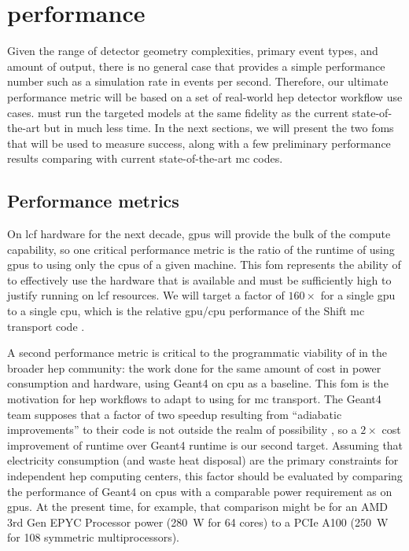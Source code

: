 \section{\celeritas performance}

Given the range of detector geometry complexities, primary event types, and
amount of output, there is no general case that provides a simple performance
number such as a simulation rate in events per second. Therefore, our ultimate
performance metric will be based on a set of real-world \acs{hep} detector
workflow use cases. \celeritas must run the targeted models at the same fidelity
as the current state-of-the-art but in much less time. In the next sections,  we
will present the two \acp{fom} that will be used to measure success, along with
a few preliminary performance results comparing \celeritas with current
state-of-the-art \ac{mc} codes.

\subsection{Performance metrics}

On \ac{lcf} hardware for the next decade, \acp{gpu} will provide the bulk of the
compute capability, so one critical performance metric is the ratio of the
runtime of \celeritas using \acp{gpu} to using only the \acp{cpu} of a given
machine. This \ac{fom} represents the ability of \celeritas to effectively use
the hardware that is available and must be sufficiently high to justify running
on \ac{lcf} resources. We will target a factor of $160\times$ for a single
\ac{gpu} to a single \ac{cpu}, which is the relative \ac{gpu}/\ac{cpu}
performance of the Shift \ac{mc} transport code
\cite{hamilton_continuous-energy_2019}.

A second performance metric is critical to the programmatic viability of
\celeritas in the broader \ac{hep} community: the work done for the same amount
of cost in power consumption and hardware, using Geant4 on \ac{cpu} as a
baseline. This \ac{fom} is the motivation for \ac{hep} workflows to adapt to
using \celeritas for \ac{mc} transport. The Geant4 team supposes that a factor
of two speedup resulting from ``adiabatic improvements'' to their code is not
outside the realm of possibility \cite{marc_verderi_geant4_2021}, so a $2
\times$ cost improvement of \celeritas runtime over Geant4 runtime is our second
target. Assuming that electricity consumption (and waste heat disposal) are the
primary constraints for independent \ac{hep} computing centers, this factor
should be evaluated by comparing the performance of Geant4 on \acp{cpu} with a
comparable power requirement as \celeritas on \acp{gpu}. At the present time,
for example, that comparison might be for an AMD 3rd Gen EPYC Processor power
(\SI{280}{\watt} for 64 cores) to a PCIe \nvidia A100 (\SI{250}{\watt} for 108
symmetric multiprocessors).

